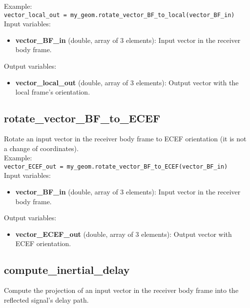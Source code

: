 Example:\\

\texttt{vector\_local\_out = my\_geom.rotate\_vector\_BF\_to\_local(vector\_BF\_in)}\\

Input variables:
\begin{itemize}
\item {\bf vector\_BF\_in} (double, array of 3 elements): Input vector in the receiver body frame.
\end{itemize}

Output variables:
\begin{itemize}
\item {\bf vector\_local\_out} (double, array of 3 elements): Output vector with the local frame's orientation.
\end{itemize}


\subsection{rotate\_vector\_BF\_to\_ECEF}

Rotate an input vector in the receiver body frame to ECEF orientation (it is not a change of coordinates).\\

Example:\\

\texttt{vector\_ECEF\_out = my\_geom.rotate\_vector\_BF\_to\_ECEF(vector\_BF\_in)}\\

Input variables:
\begin{itemize}
\item {\bf vector\_BF\_in} (double, array of 3 elements): Input vector in the receiver body frame.
\end{itemize}

Output variables:
\begin{itemize}
\item {\bf vector\_ECEF\_out} (double, array of 3 elements): Output vector with ECEF orientation.
\end{itemize}


\subsection{compute\_inertial\_delay}

Compute the projection of an input vector in the receiver body frame into the reflected signal's delay path.\\

